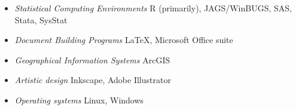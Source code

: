 \documentclass[9pt]{article}
\newenvironment{outerlist}[1][\enskip\textbullet]%
        {\begin{itemize}[#1]}{\end{itemize}%
         }
\begin{document}
\vspace{.15in}

\vspace{.15in}

  \begin{outerlist}
		\item[] \textit{Statistical Computing Environments}  R (primarily), JAGS/WinBUGS, SAS, Stata, SysStat 
		\item[] \textit{Document Building Programs} LaTeX, Microsoft Office suite
		\item[] \textit{Geographical Information Systems} ArcGIS
    \item[] \textit{Artistic design} Inkscape, Adobe Illustrator
    \item[] \textit{Operating systems} Linux, Windows
	\end{outerlist}
	\vspace{.15in}

\vspace{.15in}
\end{document}
